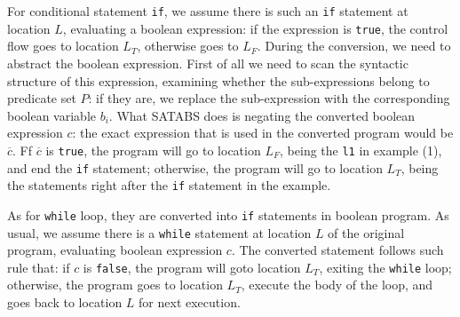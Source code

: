 For conditional statement \lstinline|if|, we assume there is such an \lstinline|if| statement at location $L$, evaluating a boolean expression: if the expression is \lstinline|true|, the control flow goes to location $L_{T}$,
otherwise goes to $L_{F}$.
During the conversion, we need to abstract the boolean expression. First of all we need to scan the syntactic structure of this expression, examining whether the sub-expressions belong to predicate set $P$:
if they are, we replace the sub-expression with the corresponding boolean variable $b_{i}$.
What SATABS does is negating the converted boolean expression $c$: the exact expression that is used in the converted program would be $\overline{c}$. Ff $\overline{c}$ is \lstinline|true|, the program will go to location $L_{F}$,
being the \lstinline|l1| in example (1), and end the \lstinline|if| statement; otherwise, the program will go to location $L_{T}$, being the statements right after the \lstinline|if| statement in the example.

As for \lstinline|while| loop, they are converted into \lstinline|if| statements in boolean program.
As usual, we assume there is a \lstinline|while| statement at location $L$ of the original program, evaluating boolean expression $c$. The converted statement follows such rule that: if $c$ is \lstinline|false|,
the program will goto location $L_{T}$, exiting the \lstinline|while| loop; otherwise, the program goes to location $L_{T}$, execute the body of the loop, and goes back to location $L$ for next execution.

